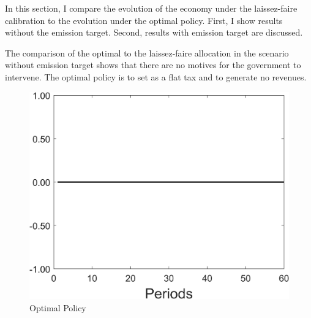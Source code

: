 In this section, I compare the evolution of the economy under the laissez-faire calibration to the evolution under the optimal policy. First, I show results without the emission target. Second, results with emission target are discussed.

The comparison of the optimal to the laissez-faire allocation in the scenario without emission target shows that there are no motives for the government to intervene. The optimal policy is to set as a flat tax and to generate no revenues. 

\begin{figure}[h!!]
	\centering
	\caption{Optimal Policy }\label{fig:optpol}
	\begin{minipage}[]{0.32\textwidth}
		\includegraphics[width=1\textwidth]{../codding_model/Own/figures/Rep_agent/staticRam_LF_separate_tauul_periods59_eppsilon4.00_zeta1.40_Ad08_Ac04_thetac0.70_thetad0.56_HetGrowth1_tauul0.181_util0_withtarget0_lgd0.png}
	\end{minipage}
	\begin{minipage}[]{0.32\textwidth}

\end{minipage}
\end{figure}
